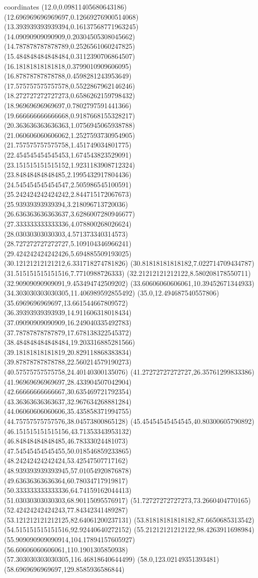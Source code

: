 coordinates {%
(12.0,0.09811405680643186)
(12.696969696969697,0.12669276900514068)
(13.393939393939394,0.16137568771963245)
(14.09090909090909,0.20304505308045662)
(14.787878787878789,0.2526561060247825)
(15.484848484848484,0.3112390706864507)
(16.18181818181818,0.3799010909606095)
(16.87878787878788,0.4598281243953649)
(17.575757575757578,0.5522867962146246)
(18.272727272727273,0.6586262159798432)
(18.96969696969697,0.7802797591441366)
(19.666666666666668,0.9187668155328217)
(20.363636363636363,1.0756945065938788)
(21.060606060606062,1.2527593730954905)
(21.757575757575758,1.451749034801775)
(22.454545454545453,1.674543823529091)
(23.151515151515152,1.9231183908712324)
(23.84848484848485,2.1995432917804436)
(24.545454545454547,2.505986545100591)
(25.242424242424242,2.844715172067673)
(25.93939393939394,3.218096713720036)
(26.636363636363637,3.6286007280946677)
(27.333333333333336,4.078800268026624)
(28.03030303030303,4.571373340314573)
(28.727272727272727,5.109104346966241)
(29.424242424242426,5.694885509193025)
(30.12121212121212,6.331718274781826)
(30.81818181818182,7.022714709434787)
(31.515151515151516,7.7710988726333)
(32.21212121212122,8.580208178550711)
(32.90909090909091,9.453494742509202)
(33.60606060606061,10.39452671344933)
(34.303030303030305,11.406989592855492)
(35.0,12.494687540557806)
(35.6969696969697,13.661544667809572)
(36.39393939393939,14.911606318018434)
(37.09090909090909,16.249040335492783)
(37.78787878787879,17.678138322545372)
(38.484848484848484,19.203316885281566)
(39.18181818181819,20.829118868383834)
(39.87878787878788,22.560214579190273)
(40.57575757575758,24.40140300135076)
(41.27272727272727,26.35761299833386)
(41.96969696969697,28.433904507042904)
(42.66666666666667,30.635469721792354)
(43.36363636363637,32.967634268881284)
(44.06060606060606,35.435858371994755)
(44.75757575757576,38.04573800865128)
(45.45454545454545,40.80300605790892)
(46.151515151515156,43.71353343953132)
(46.84848484848485,46.78333024481073)
(47.54545454545455,50.018546859233865)
(48.24242424242424,53.42547507717162)
(48.939393939393945,57.01054920876878)
(49.63636363636364,60.78034717919817)
(50.333333333333336,64.74159162044413)
(51.03030303030303,68.90115095576917)
(51.72727272727273,73.2660404770165)
(52.42424242424243,77.84342341489287)
(53.121212121212125,82.64061200237131)
(53.81818181818182,87.6650685313542)
(54.515151515151516,92.92440640272152)
(55.21212121212122,98.4263911698984)
(55.909090909090914,104.17894157605927)
(56.60606060606061,110.1901305850938)
(57.303030303030305,116.46818640644499)
(58.0,123.02149351393481)
(58.6969696969697,129.8585936586844)
}
